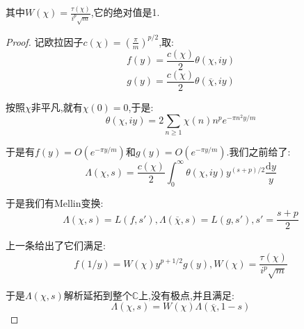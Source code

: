 \begin{enumerate}
    其中$W(\chi)=\frac{\tau(\chi)}{i^p\sqrt{m}}$,它的绝对值是1.
    \begin{proof}
    	
    	记欧拉因子$c(\chi)=\left(\frac{\pi}{m}\right)^{p/2}$,取:
    	$$f(y)=\frac{c(\chi)}{2}\theta(\chi,iy)$$
    	$$g(y)=\frac{c(\chi)}{2}\theta(\overline{\chi},iy)$$
    	
    	按照$\chi$非平凡,就有$\chi(0)=0$,于是:
    	$$\theta(\chi,iy)=2\sum_{n\ge1}\chi(n)n^pe^{-\pi n^2y/m}$$
    	
    	于是有$f(y)=O(e^{-\pi y/m})$和$g(y)=O(e^{-\pi y/m})$.我们之前给了:
    	$$\Lambda(\chi,s)=\frac{c(\chi)}{2}\int_0^{\infty}\theta(\chi,iy)y^{(s+p)/2}\frac{\mathrm{d}y}{y}$$
    	
    	于是我们有Mellin变换:
    	$$\Lambda(\chi,s)=L(f,s'),\Lambda(\overline{\chi},s)=L(g,s'),s'=\frac{s+p}{2}$$
    	
    	上一条给出了它们满足:
    	$$f(1/y)=W(\chi)y^{p+1/2}g(y),W(\chi)=\frac{\tau(\chi)}{i^p\sqrt{m}}$$
    	
    	于是$\Lambda(\chi,s)$解析延拓到整个$\mathbb{C}$上,没有极点,并且满足:
    	$$\Lambda(\chi,s)=W(\chi)\Lambda(\overline{\chi},1-s)$$
    \end{proof}
\end{enumerate}
